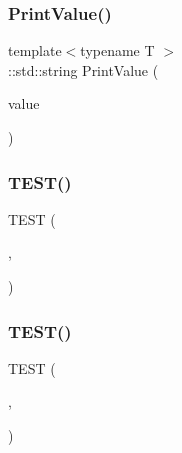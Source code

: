 \subsubsection{\texorpdfstring{PrintValue()}{PrintValue()}}
{\footnotesize\ttfamily template$<$typename T $>$ \\
\+::std\+::string Print\+Value (\begin{DoxyParamCaption}\item[{const T \&}]{value }\end{DoxyParamCaption})}

\mbox{\label{_obj__test_2lib_2googletest-release-1_88_81_2googletest_2test_2googletest-param-test-test_8cc_a884488b4ac035aaa0e1f799243479538}} 
\subsubsection{\texorpdfstring{TEST()}{TEST()}\hspace{0.1cm}{\footnotesize\ttfamily [1/22]}}
{\footnotesize\ttfamily T\+E\+ST (\begin{DoxyParamCaption}\item[{Iterator\+Test}]{,  }\item[{Param\+Iterator\+Conforms\+To\+Forward\+Iterator\+Concept}]{ }\end{DoxyParamCaption})}

\mbox{\label{_obj__test_2lib_2googletest-release-1_88_81_2googletest_2test_2googletest-param-test-test_8cc_aa1294eff6c7aea20468f93a70e6b157d}} 
\subsubsection{\texorpdfstring{TEST()}{TEST()}\hspace{0.1cm}{\footnotesize\ttfamily [2/22]}}
{\footnotesize\ttfamily T\+E\+ST (\begin{DoxyParamCaption}\item[{Range\+Test}]{,  }\item[{Int\+Range\+With\+Default\+Step}]{ }\end{DoxyParamCaption})}

